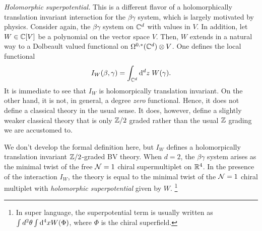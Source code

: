 \documentclass[11pt]{amsart}
\def\brian{\textcolor{blue}{BW: }\textcolor{blue}}
\begin{document}
\begin{eg} {\em Holomorphic superpotential.} 
This is a different flavor of a holomorphically translation invariant interaction for the $\beta\gamma$ system, which is largely motivated by physics. 
Consider again, the $\beta\gamma$ system on $\mathbb C^d$ with values in $V$. 
In addition, let $W \in \mathbb C[V]$ be a polynomial on the vector space $V$. 
Then, $W$ extends in a natural way to a Dolbeault valued functional on $\Omega^{0,*}(\mathbb C^d) \otimes V$. 
One defines the local functional
\[
I_W (\beta, \gamma) = \int_{\mathbb C^d} {\rm d}^d z \; W(\gamma) .
\] 
It is immediate to see that $I_W$ is holomorpically translation invariant. 
On the other hand, it is not, in general, a degree {\em zero} functional. 
Hence, it does not define a classical theory in the usual sense. 
It does, however, define a slightly weaker classical theory that is only $\mathbb Z/2$ graded rather than the usual $\mathbb Z$ grading we are accustomed to.
 
We don't develop the formal definition here, but $I_W$ defines a holomorpically translation invariant $\mathbb Z/2$-graded BV theory. 
When $d=2$, the $\beta\gamma$ system arises as the minimal twist of the free $\mathcal N = 1$ chiral supermultiplet on $\mathbb R^4$. 
In the presence of the interaction $I_W$, the theory is equal to the minimal twist of the $\mathcal N=1$ chiral multiplet with {\em holomorphic superpotential} given by $W$. \footnote{In super language, the superpotential term is usually written as $\int d^2 \theta \int {\rm d}^4 x W(\Phi)$, where $\Phi$ is the chiral superfield.}
\end{eg}

%
%
\end{document}
